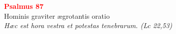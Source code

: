 


\def\greinitialformat#1{%
{\fontsize{39}{39}\selectfont #1}%
}




\vspace{0.3cm}
\begin{center}
 \textcolor{red}{\large \bf Psalmus 87}\\
Hominis graviter ægrotantis oratio\\
\textit{\small Hæc est hora vestra et potestas tenebrarum. (Lc 22,53)}
\end{center}
